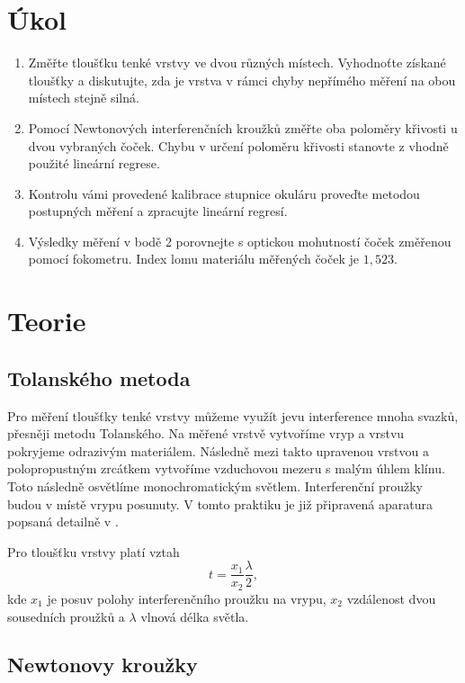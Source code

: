 \documentclass{protokol}
\begin{document}
  \section*{Úkol}

    \begin{enumerate}
      \item Změřte tloušťku tenké vrstvy ve dvou různých místech. Vyhodnoťte získané tloušťky a diskutujte, zda je vrstva v rámci chyby nepřímého měření na obou místech stejně silná.
      \item Pomocí Newtonových interferenčních kroužků změřte oba poloměry křivosti u dvou vybraných čoček. Chybu v určení poloměru křivosti stanovte z vhodně použité lineární regrese.
      \item Kontrolu vámi provedené kalibrace stupnice okuláru proveďte metodou postupných měření a zpracujte lineární regresí.
      \item Výsledky měření v bodě 2 porovnejte s optickou mohutností čoček změřenou pomocí fokometru. Index lomu materiálu měřených čoček je \(1,523\).
    \end{enumerate}

  \section*{Teorie}

    \subsection*{Tolanského metoda}

      Pro měření tloušťky tenké vrstvy můžeme využít jevu interference mnoha svazků, přesněji metodu Tolanského. Na měřené vrstvě vytvoříme vryp a vrstvu pokryjeme odrazivým materiálem. Následně mezi takto upravenou vrstvou a polopropustným zrcátkem vytvoříme vzduchovou mezeru s malým úhlem klínu. Toto následně osvětlíme monochromatickým světlem. Interferenční proužky budou v místě vrypu posunuty. V tomto praktiku je již připravená aparatura popsaná detailně v \cite{mereni}. 
      
      Pro tloušťku vrstvy platí vztah
      \begin{equation} \label{eq:vrstva}
        t = \frac{x_1}{x_2} \frac{\lambda}{2},
      \end{equation}
      kde $x_1$ je posuv polohy interferenčního proužku na vrypu, $x_2$ vzdálenost dvou sousedních proužků a $\lambda$ vlnová délka světla.

    \subsection*{Newtonovy kroužky}
\end{document}
